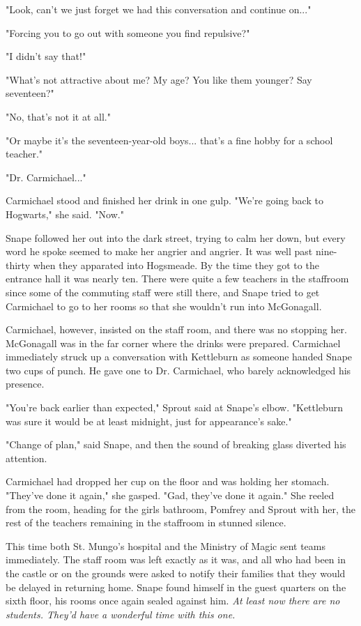 \documentclass[a4paper,11pt]{article}
\begin{document}
"Look, can't we just forget we had this conversation and continue on..."

"Forcing you to go out with someone you find repulsive?"

"I didn't say that!"

"What's not attractive about me? My age? You like them younger? Say seventeen?"

"No, that's not it at all."

"Or maybe it's the seventeen-year-old boys... that's a fine hobby for a school teacher."

"Dr. Carmichael..."

Carmichael stood and finished her drink in one gulp. "We're going back to Hogwarts," she said. "Now."

Snape followed her out into the dark street, trying to calm her down, but every word he spoke seemed to make her angrier and angrier. It was well past nine-thirty when they apparated into Hogsmeade. By the time they got to the entrance hall it was nearly ten. There were quite a few teachers in the staffroom since some of the commuting staff were still there, and Snape tried to get Carmichael to go to her rooms so that she wouldn't run into McGonagall.

Carmichael, however, insisted on the staff room, and there was no stopping her. McGonagall was in the far corner where the drinks were prepared. Carmichael immediately struck up a conversation with Kettleburn as someone handed Snape two cups of punch. He gave one to Dr. Carmichael, who barely acknowledged his presence.

"You're back earlier than expected," Sprout said at Snape's elbow. "Kettleburn was sure it would be at least midnight, just for appearance's sake."

"Change of plan," said Snape, and then the sound of breaking glass diverted his attention.

Carmichael had dropped her cup on the floor and was holding her stomach. "They've done it again," she gasped. "Gad, they've done it again." She reeled from the room, heading for the girls bathroom, Pomfrey and Sprout with her, the rest of the teachers remaining in the staffroom in stunned silence.

This time both St. Mungo's hospital and the Ministry of Magic sent teams immediately. The staff room was left exactly as it was, and all who had been in the castle or on the grounds were asked to notify their families that they would be delayed in returning home. Snape found himself in the guest quarters on the sixth floor, his rooms once again sealed against him. \emph{At least now there are no students. They'd have a wonderful time with this one.}
\end{document}
